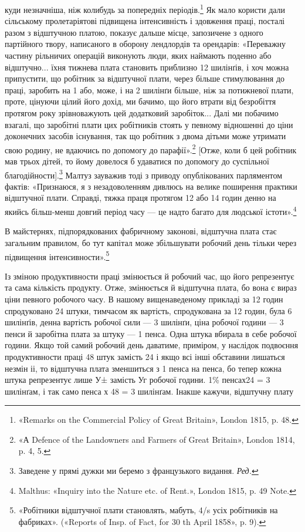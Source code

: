 \parcont{}  %
куди незначніша, ніж колибудь за попередніх періодів.\footnote{
«Remarks on the Commercial Policy of Great Britain», London
1815, p. 48.
} Як
мало користи дали сільському пролетаріятові підвищена інтенсивність
і здовження праці, посталі разом з відштучною платою,
показує дальше місце, запозичене з одного партійного твору,
написаного в оборону лендлордів та орендарів: «Переважну
частину рільничих операцій виконують люди, яких наймають
поденно або відштучно... їхня тижнева плата становить приблизно
12 шилінґів, і хоч можна припустити, що робітник за відштучної
плати, через більше стимулювання до праці, заробить на 1 або,
може, і на 2 шилінґи більше, ніж за потижневої плати, проте,
цінуючи цілий його дохід, ми бачимо, що його втрати від безробіття
протягом року зрівноважують цей додатковий заробіток...
Далі ми побачимо взагалі, що заробітні плати цих робітників
стоять у певному відношенні до ціни доконечних засобів існування,
так що робітник з двома дітьми може утримати свою родину,
не вдаючись по допомогу до парафії».\footnote{
«А Defence of the Landowners and Farmers of Great Britain», London
1814, p. 4, 5.
} [Отже, коли б цей
робітник мав трьох дітей, то йому довелося б удаватися по допомогу
до суспільної благодійности].\footnote*{
Заведене у прямі дужки ми беремо з французького видання. \emph{Ред.}
} Малтуз зауважив тоді з
приводу опублікованих парляментом фактів: «Признаюся, я з
незадоволенням дивлюсь на велике поширення практики відштучної
плати. Справді, тяжка праця протягом 12 або 14 годин
денно на якийсь більш-менш довгий період часу — це надто багато
для людської істоти».\footnote{
Malthus: «Inquiry into the Nature etc. of Rent.», London 1815,
p. 49 Note.
}

В майстернях, підпорядкованих фабричному законові, відштучна
плата стає загальним правилом, бо тут капітал може збільшувати
робочий день тільки через підвищення інтенсивности».\footnote{
«Робітники відштучної плати становлять, мабуть, 4/s усіх робітників
на фабриках». («Reports of Insp. of Fact, for 30 th April
1858», p. 9).
}

Із зміною продуктивности праці змінюється й робочий час,
що його репрезентує та сама кількість продукту. Отже, змінюється
й відштучна плата, бо вона є вираз ціни певного робочого
часу. В нашому вищенаведеному прикладі за 12 годин спродуковано
24 штуки, тимчасом як вартість, спродукована за 12 годин,
була 6 шилінґів, денна вартість робочої сили — 3 шилінґи,
ціна робочої години — 3 пенси й заробітна плата за штуку —
1 пенса. Одна штука вбирала в себе  робочої години. Якщо
той самий робочий день даватиме, приміром, у наслідок подвоєння
продуктивности праці 48 штук замість 24 і якщо всі інші
обставини лишаться незмін іі, то відштучна плата зменшиться
з 1 пенса на  пенса, бо тепер кожна штука репрезентує лише
У± замість Уг робочої години. 1\% пенсах24 = 3 шилінґам, і так
само  пенса х 48 = 3 шилінґам. Інакше кажучи, відштучну плату
\parbreak{}  %
